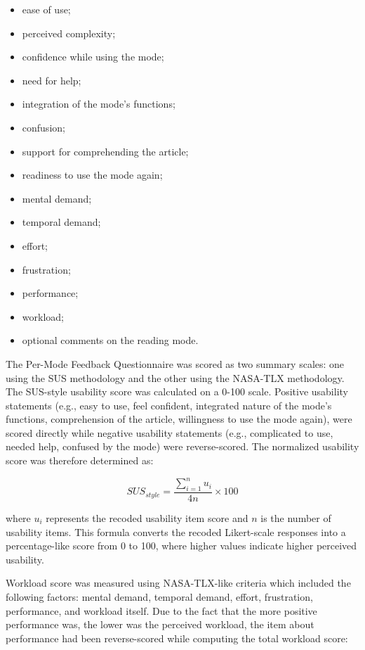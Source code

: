 \documentclass{IEEEtran}
\begin{document}
\begin{itemize}
    \item ease of use;
    \item perceived complexity;
    \item confidence while using the mode;
    \item need for help;
     \item integration of the mode’s functions;
     \item confusion;
    \item support for comprehending the article;
    \item readiness to use the mode again;
    \item mental demand;
    \item temporal demand;
    \item effort;
    \item frustration;
    \item performance;
    \item workload;
    \item optional comments on the reading mode.
\end{itemize}

The Per-Mode Feedback Questionnaire was scored as two summary scales: one using the SUS methodology and the other using the NASA-TLX methodology. The SUS-style usability score was calculated on a 0-100 scale. Positive usability statements (e.g., easy to use, feel confident, integrated nature of the mode's functions, comprehension of the article, willingness to use the mode again), were scored directly while negative usability statements (e.g., complicated to use, needed help, confused by the mode) were reverse-scored. The normalized usability score was therefore determined as:

\begin{equation}
SUS_{style} = \frac{\sum_{i=1}^{n} u_i}{4n} \times 100
\end{equation}

where $u_i$ represents the recoded usability item score and $n$ is the number of usability items. This formula converts the recoded Likert-scale responses into a percentage-like score from 0 to 100, where higher values indicate higher perceived usability.

Workload score was measured using NASA-TLX-like criteria which included the following factors: mental demand, temporal demand, effort, frustration, performance, and workload itself. Due to the fact that the more positive performance was, the lower was the perceived workload, the item about performance had been reverse-scored while computing the total workload score:
\end{document}
